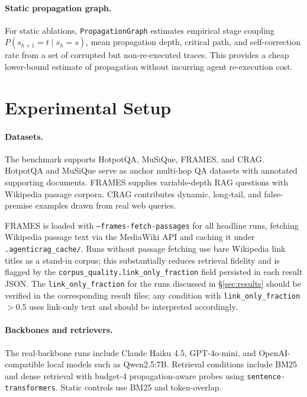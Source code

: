 \documentclass[11pt]{article}
\begin{document}
\paragraph{Static propagation graph.}
For static ablations, \texttt{PropagationGraph} estimates empirical stage
coupling $P(s_{h+1}{=}t \mid s_h{=}s)$, mean propagation depth, critical path,
and self-correction rate from a set of corrupted but non-re-executed traces.
This provides a cheap lower-bound estimate of propagation without incurring
agent re-execution cost.

\section{Experimental Setup}
\label{sec:setup}

\paragraph{Datasets.}
The benchmark supports HotpotQA, MuSiQue, FRAMES, and CRAG.  HotpotQA and
MuSiQue serve as anchor multi-hop QA datasets with annotated supporting
documents.  FRAMES supplies variable-depth RAG questions with Wikipedia passage
corpora.  CRAG contributes dynamic, long-tail, and false-premise examples drawn
from real web queries.

FRAMES is loaded with \texttt{--frames-fetch-passages} for all headline runs,
fetching Wikipedia passage text via the MediaWiki API and caching it under
\texttt{.agenticrag\_cache/}.  Runs without passage fetching use bare Wikipedia
link titles as a stand-in corpus; this substantially reduces retrieval fidelity
and is flagged by the \texttt{corpus\_quality.link\_only\_fraction} field
persisted in each result JSON.  The \texttt{link\_only\_fraction} for the
runs discussed in \S\ref{sec:results} should be verified in the corresponding
result files; any condition with \texttt{link\_only\_fraction} $> 0.5$ uses
link-only text and should be interpreted accordingly.

\paragraph{Backbones and retrievers.}
The real-backbone runs include Claude Haiku 4.5, GPT-4o-mini, and
OpenAI-compatible local models such as Qwen2.5:7B.  Retrieval conditions
include BM25 \citep{robertson2009bm25} and dense retrieval with budget-4
propagation-aware probes using \texttt{sentence-transformers}.  Static controls
use BM25 and token-overlap.
\end{document}
